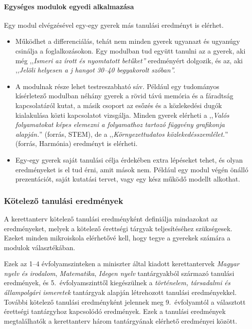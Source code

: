 \paragraph{Egységes modulok egyedi alkalmazása}

Egy modul elvégzésével egy-egy gyerek más tanulási eredményt is elérhet.

\begin{itemize}
      \item
            Működhet a differenciálás, tehát nem minden gyerek ugyanazt és
            ugyanúgy csinálja a foglalkozásokon. Egy modulban tud
            együtt	tanulni az a gyerek, aki még ,,\emph{Ismeri az
                  írott és nyomtatott  betűket''} eredményért dolgozik,
            és az, aki ,,\emph{Jelöli helyesen a j	hangot 30--40
                  begyakorolt szóban''.}
      \item
            A modulnak része lehet testreszabható sáv. Például egy tudományos
            kísérletező modulban néhány gyerek a rövid távú
            memória és a	fáradtság kapcsolatáról kutat, a másik
            csoport az esőzés és a	közlekedési dugók kialakulása
            közti kapcsolatot vizsgálja. Minden  gyerek elérheti a
            ,,\emph{Valós folyamatokat képes elemezni a folyamathoz
                  tartozó függvény grafikonja alapján.}'' (forrás, STEM), de a
            ,,\emph{Környezettudatos közlekedésszemlélet.}''
            (forrás, Harmónia)	eredményt is elérheti.
      \item
            Egy-egy gyerek saját tanulási célja érdekében extra lépéseket
            tehet, és olyan eredményeket is el tud érni, amit mások
            nem.	Például egy modul végén önálló prezentációt, saját
            kutatási  tervet, vagy egy kész működő modellt alkothat.
\end{itemize}

\subsubsection{Kötelező tanulási eredmények}
\label{sec:kotelezo_tanulasi_eredmenyek}
A kerettanterv kötelező tanulási eredményként definiálja mindazokat az
eredményeket, melyek a kötelező érettségi tárgyak teljesítéséhez
szükségesek. Ezeket minden mikroiskola elérhetővé kell, hogy tegye a
gyerekek számára a modulok választékában.

Ezek az 1--4 évfolyamszinteken a miniszter által kiadott kerettantervek
\emph{Magyar nyelv és irodalom}, \emph{Matematika}, \emph{Idegen nyelv}
tantárgyakból
származó tanulási eredmények, és 5.~évfolyamszinttől kiegészülnek a
\emph{történelem, társadalmi és állampolgári ismeretek} tantárgyak alapján
létrehozott tanulási eredményekkel. További kötelező tanulási
eredményként jelennek meg 9.~évfolyamtól a választott érettségi
tantárgyhoz kapcsolódó eredmények. Ezek a tanulási eredmények
megtalálhatók a kerettanterv három tantárgyának elérhető eredményei
között.

